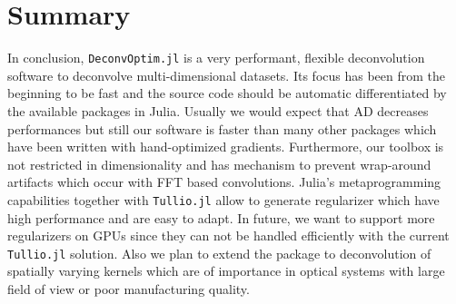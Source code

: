 \documentclass{juliacon}
\begin{document}
\section{Summary}
    In conclusion, \verb|DeconvOptim.jl| is a very performant, flexible deconvolution software to deconvolve multi-dimensional datasets.
    Its focus has been from the beginning to be fast and the source code should be automatic differentiated by the available
    packages in Julia. Usually we would expect that AD decreases performances but still our software is faster than
    many other packages which have been written with hand-optimized gradients.
    Furthermore, our toolbox is not restricted in dimensionality and has mechanism to prevent wrap-around artifacts which
    occur with FFT based convolutions.
    Julia's metaprogramming capabilities together with \verb|Tullio.jl| allow to generate regularizer which have high performance
    and are easy to adapt.
    In future, we want to support more regularizers on GPUs since they can not be handled efficiently with the current \verb|Tullio.jl| solution.
    Also we plan to extend the package to deconvolution of spatially varying kernels which are of importance in optical systems
    with large field of view or poor manufacturing quality.
    



\end{document}
